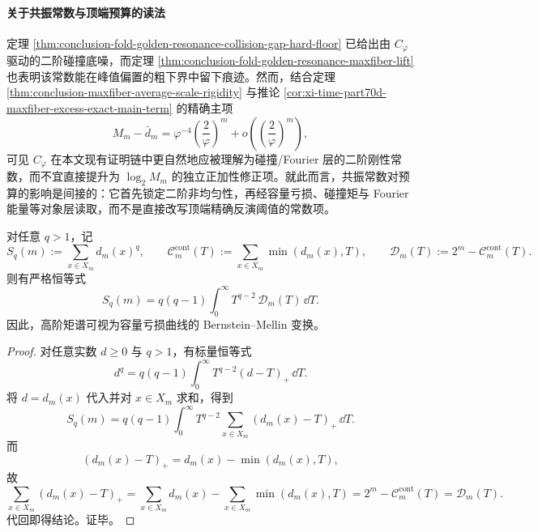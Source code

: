 \paragraph{关于共振常数与顶端预算的读法}
定理 \ref{thm:conclusion-fold-golden-resonance-collision-gap-hard-floor} 已给出由 \(C_\varphi\) 驱动的二阶碰撞底噪，而定理 \ref{thm:conclusion-fold-golden-resonance-maxfiber-lift} 也表明该常数能在峰值偏置的粗下界中留下痕迹。然而，结合定理 \ref{thm:conclusion-maxfiber-average-scale-rigidity} 与推论 \ref{cor:xi-time-part70d-maxfiber-excess-exact-main-term} 的精确主项
\[
M_m-\bar d_m
=
\varphi^{-4}\left(\frac{2}{\varphi}\right)^m
+o\!\left(\left(\frac{2}{\varphi}\right)^m\right),
\]
可见 \(C_\varphi\) 在本文现有证明链中更自然地应被理解为碰撞/Fourier 层的二阶刚性常数，而不宜直接提升为 \(\log_2 M_m\) 的独立正加性修正项。就此而言，共振常数对预算的影响是间接的：它首先锁定二阶非均匀性，再经容量亏损、碰撞矩与 Fourier 能量等对象层读取，而不是直接改写顶端精确反演阈值的常数项。

\begin{proposition}\label{prop:conclusion-capacity-defect-bernstein-mellin}
对任意 \(q>1\)，记
\[
S_q(m):=\sum_{x\in X_m}d_m(x)^q,
\qquad
\mathcal C_m^{\mathrm{cont}}(T):=\sum_{x\in X_m}\min(d_m(x),T),
\qquad
\mathcal D_m(T):=2^m-\mathcal C_m^{\mathrm{cont}}(T).
\]
则有严格恒等式
\[
S_q(m)
=
q(q-1)\int_0^\infty T^{q-2}\,\mathcal D_m(T)\,\dd T.
\]
因此，高阶矩谱可视为容量亏损曲线的 Bernstein--Mellin 变换。
\end{proposition}
\begin{proof}
对任意实数 \(d\ge 0\) 与 \(q>1\)，有标量恒等式
\[
d^q
=
q(q-1)\int_0^\infty T^{q-2}(d-T)_+\,\dd T.
\]
将 \(d=d_m(x)\) 代入并对 \(x\in X_m\) 求和，得到
\[
S_q(m)
=
q(q-1)\int_0^\infty T^{q-2}
\sum_{x\in X_m}(d_m(x)-T)_+\,\dd T.
\]
而
\[
(d_m(x)-T)_+=d_m(x)-\min(d_m(x),T),
\]
故
\[
\sum_{x\in X_m}(d_m(x)-T)_+
=
\sum_{x\in X_m}d_m(x)-\sum_{x\in X_m}\min(d_m(x),T)
=
2^m-\mathcal C_m^{\mathrm{cont}}(T)
=
\mathcal D_m(T).
\]
代回即得结论。证毕。
\end{proof}

